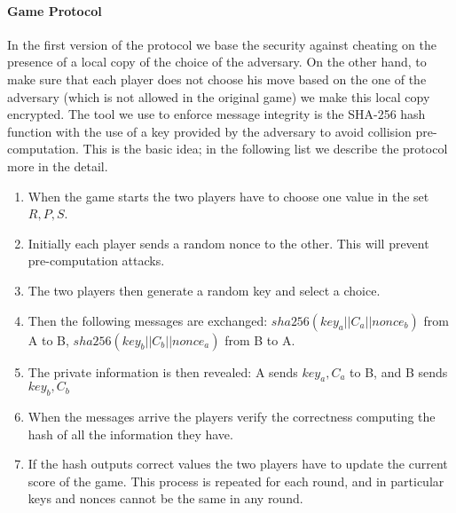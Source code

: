 \documentclass[11pt]{article}
\begin{document}
\paragraph*{Game Protocol}
In the first version of the protocol we base the security against cheating on the presence of a local copy of the choice of the adversary. On the other hand, to make sure that each player does not choose his move based on the one of the adversary (which is not allowed in the original game) we make this local copy encrypted. The tool we use to enforce message integrity is the SHA-256 hash function with the use of a key provided by the adversary to avoid collision pre-computation. This is the basic idea; in the following list we describe the protocol more in the detail.
\begin{enumerate}
\item When the game starts the two players have to choose one value in the set ${R, P, S}$.
\item Initially each player sends a random nonce to the other. This will prevent pre-computation attacks.
\item The two players then generate a random key and select a choice. 
\item Then the following messages are exchanged: $sha256(key_a||C_a||nonce_b)$ from A to B, $sha256(key_b||C_b||nonce_a)$ from B to A.
\item The private information is then revealed: A sends $key_a, C_a$ to B, and B sends $key_b, C_b$
\item When the messages arrive the players verify the correctness computing the hash of all the information they have.
\item If the hash outputs correct values the two players have to update the current score of the game. This process is repeated for each round, and in particular keys and nonces cannot be the same in any round.
\end{enumerate}
\end{document}
